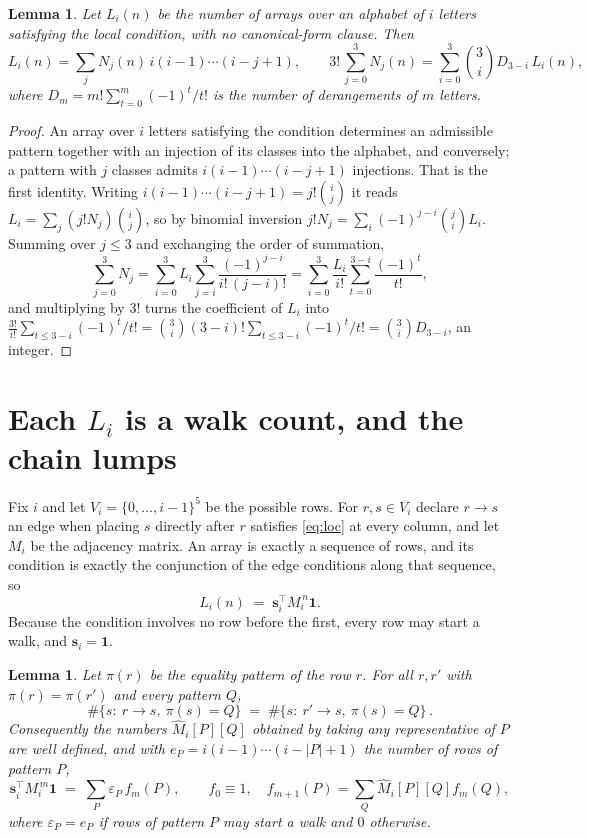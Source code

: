 \documentclass[11pt,a4paper]{article}
\theoremstyle{plain}
\newtheorem{lemma}[theorem]{Lemma}
\theoremstyle{definition}
\begin{document}
\begin{lemma}\label{lem:inv}
Let $L_i(n)$ be the number of arrays over an alphabet of $i$ letters satisfying the local
condition, with no canonical-form clause. Then
\[
L_i(n)=\sum_j N_j(n)\,i(i-1)\cdots(i-j+1),
\qquad
3!\,\sum_{j=0}^{3}N_j(n)=\sum_{i=0}^{3}\binom{3}{i}D_{3-i}\,L_i(n),
\]
where $D_m=m!\sum_{t=0}^{m}(-1)^t/t!$ is the number of derangements of $m$ letters.
\end{lemma}

\begin{proof}
An array over $i$ letters satisfying the condition determines an admissible pattern together
with an injection of its classes into the alphabet, and conversely; a pattern with $j$
classes admits $i(i-1)\cdots(i-j+1)$ injections. That is the first identity. Writing
$i(i-1)\cdots(i-j+1)=j!\binom{i}{j}$ it reads $L_i=\sum_j (j!N_j)\binom{i}{j}$, so by
binomial inversion $j!N_j=\sum_{i}(-1)^{j-i}\binom{j}{i}L_i$. Summing over
$j\le 3$ and exchanging the order of summation,
\[
\sum_{j=0}^{3}N_j=\sum_{i=0}^{3}L_i\sum_{j=i}^{3}\frac{(-1)^{j-i}}{i!\,(j-i)!}
=\sum_{i=0}^{3}\frac{L_i}{i!}\sum_{t=0}^{3-i}\frac{(-1)^t}{t!} ,
\]
and multiplying by $3!$ turns the coefficient of $L_i$ into
$\frac{3!}{i!}\sum_{t\le 3-i}(-1)^t/t!=\binom{3}{i}(3-i)!\sum_{t\le 3-i}(-1)^t/t!
=\binom{3}{i}D_{3-i}$, an integer.
\end{proof}

\section{Each $L_i$ is a walk count, and the chain lumps}

Fix $i$ and let $V_i=\{0,\dots,i-1\}^{5}$ be the possible rows. For $r,s\in V_i$
declare $r\to s$ an edge when placing $s$ directly after $r$ satisfies \eqref{eq:loc} at
every column, and let $M_i$ be the adjacency matrix. An array is exactly a sequence of
rows, and its condition is exactly the conjunction of the edge conditions along that
sequence, so
\[
L_i(n)\;=\;\mathbf{s}_i^{\!\top}M_i^{\,n}\mathbf{1} .
\]
Because the condition involves no row before the first, every
row may start a walk, and $\mathbf{s}_i=\mathbf{1}$.

\begin{lemma}\label{lem:lump}
Let $\pi(r)$ be the equality pattern of the row $r$. For all $r,r'$ with
$\pi(r)=\pi(r')$ and every pattern $Q$,
\[
\#\{s:\ r\to s,\ \pi(s)=Q\}\;=\;\#\{s:\ r'\to s,\ \pi(s)=Q\}\, .
\]
Consequently the numbers $\widehat M_i[P][Q]$ obtained by taking any representative of $P$
are well defined, and with $e_P=i(i-1)\cdots(i-|P|+1)$ the number of rows of pattern $P$,
\[
\mathbf{s}_i^{\!\top}M_i^{\,m}\mathbf{1}\;=\;\sum_P \varepsilon_P\,f_m(P),
\qquad f_0\equiv1,\quad f_{m+1}(P)=\sum_Q\widehat M_i[P][Q]f_m(Q),
\]
where $\varepsilon_P=e_P$ if rows of pattern $P$ may start a walk and $0$ otherwise.
\end{lemma}
\end{document}
